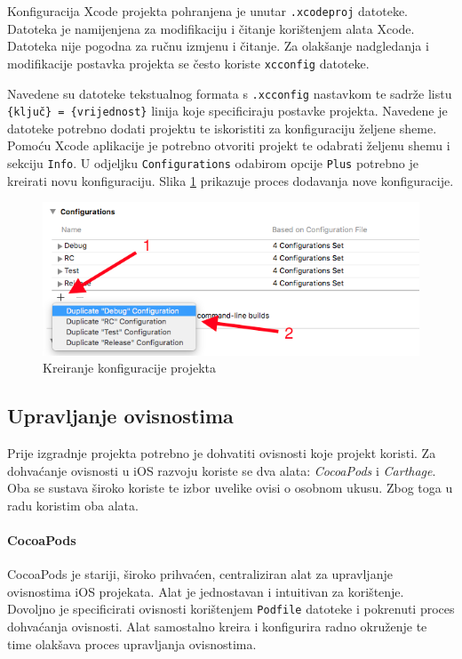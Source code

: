 \documentclass[times, utf8, diplomski, numeric]{fer}
\begin{document}
Konfiguracija Xcode projekta pohranjena je unutar \verb|.xcodeproj| datoteke. Datoteka je namijenjena za modifikaciju i čitanje korištenjem alata Xcode. Datoteka nije pogodna za ručnu izmjenu i čitanje. Za olakšanje nadgledanja i modifikacije postavka projekta se često koriste \verb|xcconfig| datoteke.

Navedene su datoteke tekstualnog formata s \verb|.xcconfig| nastavkom te sadrže listu \verb|{ključ} = {vrijednost}| linija koje specificiraju postavke projekta. Navedene je datoteke potrebno dodati projektu te iskoristiti za konfiguraciju željene sheme. Pomoću Xcode aplikacije je potrebno otvoriti projekt te odabrati željenu shemu i sekciju \verb|Info|. U odjeljku \verb|Configurations| odabirom opcije \verb|Plus| potrebno je kreirati novu konfiguraciju. Slika \ref{fig:XcodeConfigurations} prikazuje proces dodavanja nove konfiguracije.

\begin{figure}[h!]
\centering
\includegraphics[scale=0.7]{XcodeConfigurations}
\caption{Kreiranje konfiguracije projekta}
\label{fig:XcodeConfigurations}
\end{figure}

\subsection{Upravljanje ovisnostima}

Prije izgradnje projekta potrebno je dohvatiti ovisnosti koje projekt koristi. Za dohvaćanje ovisnosti u iOS razvoju koriste se dva alata: \textit{CocoaPods} i \textit{Carthage}. Oba se sustava široko koriste te izbor uvelike ovisi o osobnom ukusu. Zbog toga u radu koristim oba alata.

\paragraph{CocoaPods}

CocoaPods je stariji, široko prihvaćen, centraliziran alat za upravljanje ovisnostima iOS projekata. Alat je jednostavan i intuitivan za korištenje. Dovoljno je specificirati ovisnosti korištenjem \verb|Podfile| datoteke i pokrenuti proces dohvaćanja ovisnosti. Alat samostalno kreira i konfigurira radno okruženje te time olakšava proces upravljanja ovisnostima.
\end{document}
